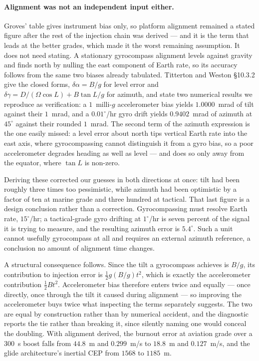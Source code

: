\documentclass[11pt,a4paper]{article}
\theoremstyle{definition}
\numberwithin{equation}{section}
\begin{document}
\paragraph{Alignment was not an independent input either.} Groves' table gives instrument bias only, so platform alignment remained a stated figure after the rest of the injection chain was derived --- and it is the term that leads at the better grades, which made it the worst remaining assumption. It does not need stating. A stationary gyrocompass alignment levels against gravity and finds north by nulling the east component of Earth rate, so its accuracy follows from the same two biases already tabulated. Titterton and Weston \cite{titterton2004} \S10.3.2 give the closed forms, $\delta\alpha = B/g$ for level error and $\delta\gamma = D/(\Omega\cos L) + B\tan L/g$ for azimuth, and state two numerical results we reproduce as verification: a $1$~milli-$g$ accelerometer bias yields $1.0000$~mrad of tilt against their $1$~mrad, and a $0.01^\circ$/hr gyro drift yields $0.9402$~mrad of azimuth at $45^\circ$ against their rounded $1$~mrad. The second term of the azimuth expression is the one easily missed: a level error about north tips vertical Earth rate into the east axis, where gyrocompassing cannot distinguish it from a gyro bias, so a poor accelerometer degrades heading as well as level --- and does so only away from the equator, where $\tan L$ is non-zero.

Deriving these corrected our guesses in both directions at once: tilt had been roughly three times too pessimistic, while azimuth had been optimistic by a factor of ten at marine grade and three hundred at tactical. That last figure is a design conclusion rather than a correction. Gyrocompassing must resolve Earth rate, $15^\circ$/hr; a tactical-grade gyro drifting at $1^\circ$/hr is seven percent of the signal it is trying to measure, and the resulting azimuth error is $5.4^\circ$. Such a unit cannot usefully gyrocompass at all and requires an external azimuth reference, a conclusion no amount of alignment time changes.

A structural consequence follows. Since the tilt a gyrocompass achieves is $B/g$, its contribution to injection error is $\tfrac12 g (B/g) t^2$, which is exactly the accelerometer contribution $\tfrac12 B t^2$. Accelerometer bias therefore enters twice and equally --- once directly, once through the tilt it caused during alignment --- so improving the accelerometer buys twice what inspecting the terms separately suggests. The two are equal by construction rather than by numerical accident, and the diagnostic reports the tie rather than breaking it, since silently naming one would conceal the doubling. With alignment derived, the burnout error at aviation grade over a $300$~s boost falls from $44.8$~m and $0.299$~m/s to $18.8$~m and $0.127$~m/s, and the glide architecture's inertial CEP from $1568$ to $1185$~m.
\end{document}

